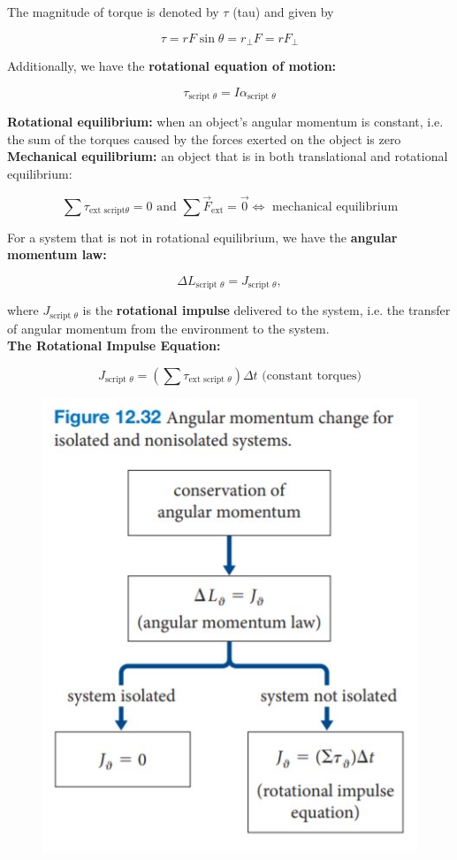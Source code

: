         The magnitude of torque is denoted by $\tau$ (tau) and given by

        \[
            \tau = rF\sin{\theta} = r_{\bot} F = rF_{\bot}
        \]

        Additionally, we have the \textbf{rotational equation of motion:}

        \[
            \tau_{\text{script }\theta} = I\alpha_{\text{script }\theta}
        \]

        \textbf{Rotational equilibrium:} when an object's angular momentum is constant, i.e. the sum of the torques caused by the forces exerted on the object is zero \\
        \textbf{Mechanical equilibrium:} an object that is in both translational and rotational equilibrium:

        \[
            \sum \tau_{\text{ext script}\theta} = 0 \text{ and } \sum \vec{F}_{\text{ext}}=\vec{0} \iff \text{ mechanical equilibrium}
        \]

        For a system that is not in rotational equilibrium, we have the \textbf{angular momentum law:}

        \[
            \Delta L_{\text{script }\theta} = J_{\text{script }\theta},
        \]

        where $J_{\text{script }\theta}$ is the \textbf{rotational impulse} delivered to the system, i.e. the transfer of angular momentum from the environment to the system. \\

        \textbf{The Rotational Impulse Equation:}

        \[
            J_{\text{script }\theta} = \left(\sum \tau_{\text{ext script }\theta}\right) \Delta t \text{ (constant torques)}
        \]

        \begin{figure}[hbt!]
            \centering
            \includegraphics[scale=0.4]{Resources/Conservation_Angular_Momentum}
        \end{figure}
